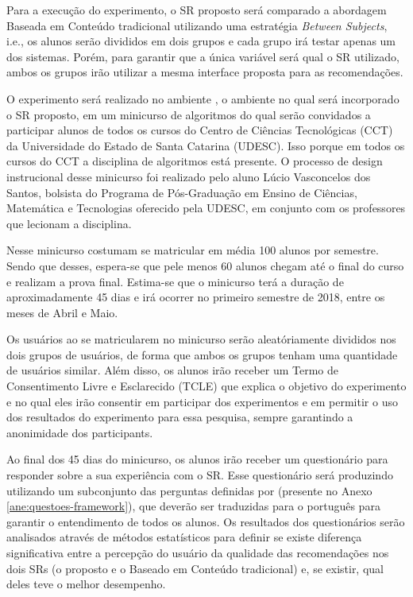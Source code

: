 Para a execução do experimento, o SR proposto será comparado a abordagem Baseada em Conteúdo tradicional utilizando uma
estratégia \textit{Between Subjects}, i.e., os alunos serão divididos em dois grupos e cada grupo irá testar apenas
um dos sistemas. Porém, para garantir que a única variável será qual o SR utilizado, ambos os grupos irão utilizar a mesma
interface proposta para as recomendações.

O experimento será realizado no ambiente \adaptweb, o ambiente no qual será incorporado o
SR proposto, em um minicurso de algoritmos do qual serão convidados a participar alunos de todos os cursos do Centro de
Ciências Tecnológicas (CCT) da Universidade do Estado de Santa Catarina (UDESC). Isso porque em todos os cursos do CCT
a disciplina de algoritmos está presente. O processo de design instrucional desse minicurso foi realizado pelo aluno
Lúcio Vasconcelos dos Santos, bolsista do Programa de Pós-Graduação em Ensino de Ciências, Matemática e Tecnologias
oferecido pela UDESC, em conjunto com os professores que lecionam a disciplina.

Nesse minicurso costumam se matricular em média 100 alunos por semestre. Sendo que desses, espera-se que pele menos 60 alunos chegam até
o final do curso e realizam a prova final. Estima-se que o minicurso terá a duração de aproximadamente 45 dias e irá ocorrer no primeiro semestre
de 2018, entre os meses de Abril e Maio.

Os usuários ao se matricularem no minicurso serão aleatóriamente divididos nos dois grupos de usuários, de forma que ambos
os grupos tenham uma quantidade de usuários similar. Além disso, os alunos irão receber um Termo de Consentimento Livre
e Esclarecido (TCLE) que explica o objetivo do experimento e no qual eles irão consentir em participar dos experimentos e
em permitir o uso dos resultados do experimento para essa pesquisa, sempre garantindo a anonimidade dos participants.

Ao final dos 45 dias do minicurso, os alunos irão receber um questionário para responder sobre a sua experiência com o SR.
Esse questionário será produzindo utilizando um subconjunto das perguntas definidas por  (presente no
Anexo \ref{ane:questoes-framework}), que deverão ser traduzidas para o português para garantir o entendimento de todos os alunos.
Os resultados dos questionários serão  analisados através de métodos estatísticos para definir se existe diferença
significativa entre a percepção do usuário da qualidade das recomendações nos dois SRs (o proposto e o Baseado em Conteúdo tradicional) e, se existir,
qual deles teve o melhor desempenho.

